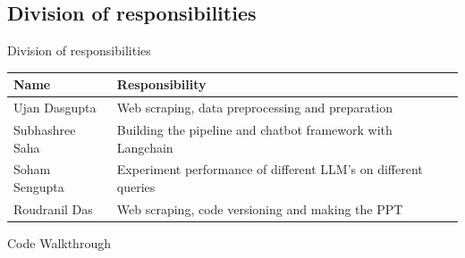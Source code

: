 \documentclass[10pt, t]{beamer}
\begin{document}
    \subsection{Division of responsibilities}
    \begin{frame}{Division of responsibilities}
        \begin{table}
            \centering
            \begin{tabular}{|l|p{20em}|}
                \hline
                \textbf{Name}   &   \textbf{Responsibility} \\\hline
                Ujan Dasgupta   &   Web scraping, data preprocessing and preparation\\\hline
                Subhashree Saha &   Building the pipeline and chatbot framework with Langchain\\\hline
                Soham Sengupta  &   Experiment performance of different LLM's on different queries\\\hline
                Roudranil Das   &   Web scraping, code versioning and making the PPT\\\hline
                
            \end{tabular}
        \end{table}
    \end{frame}

    \begin{frame}
        \vfill
        \centering
        {\Large Code Walkthrough}
        \vfill
    \end{frame}
\end{document}
